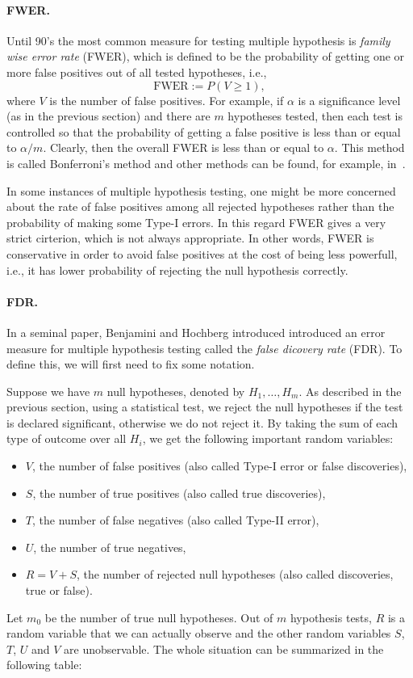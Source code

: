 \paragraph{FWER.}
Until 90's the most common measure for testing multiple hypothesis is \emph{family wise error rate} (FWER), which is defined to be the probability of getting one or more false positives out of all tested hypotheses, i.e., $$\text{FWER} := P(V \geq 1),$$ where $V$ is the number of false positives.
For example, if $\alpha$ is a significance level (as in the previous section) and there are $m$ hypotheses tested, then each test is controlled so that the probability of getting a false positive is less than or equal to $\alpha/m$.
Clearly, then the overall FWER is less than or equal to $\alpha$.
This method is called Bonferroni's method and other methods can be found, for example, in~\cite{shaffer1994multiple}.

In some instances of multiple hypothesis testing, one might be more concerned about the rate of false positives among all rejected hypotheses rather than the probability of making some Type-I errors.
In this regard FWER gives a very strict cirterion, which is not always appropriate.
In other words, FWER is conservative in order to avoid false positives at the cost of being less powerfull, i.e., it has lower probability of rejecting the null hypothesis correctly.

\paragraph{FDR.}
In a seminal paper, Benjamini and Hochberg introduced introduced an error measure for multiple hypothesis testing called the \emph{false dicovery rate} (FDR). To define this, we will first need to fix some notation.

Suppose we have $m$ null hypotheses, denoted by $H_1,\dots, H_m$.
As described in the previous section, using a statistical test, we reject the null hypotheses if the test is declared significant, otherwise we do not reject it.
By taking the sum of each type of outcome over all $H_i$, we get the following important random variables:
\begin{itemize}
\item
$V$, the number of false positives (also called Type-I error or false discoveries),
\item
$S$, the number of true positives (also called true discoveries),
\item
$T$, the number of false negatives (also called Type-II error),
\item
$U$, the number of true negatives,
\item
$R = V + S$, the number of rejected null hypotheses (also called discoveries, true or false).
\end{itemize}
Let $m_0$ be the number of true null hypotheses.
Out of $m$ hypothesis tests, $R$ is a random variable that we can actually observe and the other random variables $S$, $T$, $U$ and $V$ are unobservable.
The whole situation can be summarized in the following table:

